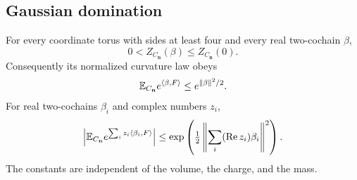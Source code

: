 \subsection{Gaussian domination}\label{subsec:slab-gaussian}

\begin{proposition}\label{thm:slab-gaussian}
For every coordinate torus with sides at least four and every real
two-cochain $\beta$,
\begin{equation}\label{eq:slab-gaussian-partition}
 0<Z_{C_{\mathbf n}}(\beta)\le Z_{C_{\mathbf n}}(0).
\end{equation}
Consequently its normalized curvature law obeys
\begin{equation}\label{eq:slab-gaussian-domination}
 \mathbb E_{C_{\mathbf n}}e^{\langle\beta,F\rangle}
                              \le e^{\|\beta\|^2/2}.
\end{equation}
For real two-cochains $\beta_i$ and complex numbers $z_i$,
\begin{equation}\label{eq:slab-complex-gaussian}
 \left|\mathbb E_{C_{\mathbf n}}e^{\sum_i z_i\langle\beta_i,F\rangle}\right|
       \le\exp\left(\tfrac12
                    \left\|\sum_i(\operatorname{Re}z_i)\beta_i\right\|^2\right).
\end{equation}
The constants are independent of the volume, the charge, and the mass.
\end{proposition}

